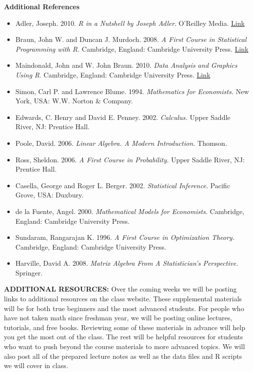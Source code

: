 \documentclass[12pt,a4paper]{article}
\begin{document}
\textbf{Additional References}
\begin{itemize}
\item Adler, Joseph. 2010. \textit{R in a Nutshell by Joseph Adler}. O'Reilley Media. \href{http://www.amazon.com/R-Nutshell-Joseph-Adler/dp/059680170X/ref=sr_1_1?ie=UTF8&qid=1305656181&sr=8-1-spell}{Link}

\item Braun, John W. and Duncan J. Murdoch. 2008. \textit{A First Course in Statistical Programming with R.} Cambridge, England: Cambridge University Press. \href{http://www.amazon.com/First-Course-Statistical-Programming/dp/0521694248/ref=sr_1_1?ie=UTF8&s=books&qid=1304605045&sr=8-1}{Link}
\item Maindonald, John and W. John Braun. 2010. \textit{Data Analysis and Graphics Using R}. Cambridge, England: Cambridge University Press. \href{http://www.amazon.com/Data-Analysis-Graphics-Using-Example-Based/dp/0521762936/ref=sr_1_1?ie=UTF8&s=books&qid=1305656286&sr=1-1}{Link}

\item Simon, Carl P. and Lawrence Blume. 1994. \textit{Mathematics for Economists.} New York, USA: W.W. Norton \& Company.
\item Edwards, C. Henry and David E. Penney. 2002. \textit{Calculus.} Upper Saddle River, NJ: Prentice Hall.
\item Poole, David. 2006. \textit{Linear Algebra. A Modern Introduction.} Thomson.
\item Ross, Sheldon. 2006. \textit{A First Course in Probability.} Upper Saddle River, NJ: Prentice Hall.
\item Casella, George and Roger L. Berger. 2002. \textit{Statistical Inference.} Pacific Grove, USA: Duxbury.
\item de la Fuente, Angel. 2000. \textit{Mathematical Models for Economists.} Cambridge, England: Cambridge University Press.
\item Sundaram, Rangarajan K. 1996. \textit{A First Course in Optimization Theory.} Cambridge, England: Cambridge University Press.
\item Harville, David A. 2008. \textit{Matrix Algebra From A Statistician's Perspective.} Springer.
\end{itemize}


\mbox{}
\textbf{ADDITIONAL RESOURCES:} Over the coming weeks we will be posting links to additional resources on the class website. These supplemental materials will be for both true beginners and the most advanced students. For people who have not taken math since freshman year, we will be posting online lectures, tutorials, and free books. Reviewing some of these materials in advance will help you get the most out of the class. The rest will be helpful resources for students who want to push beyond the course materials to more advanced topics. We will also post all of the prepared lecture notes as well as the data files and R scripts we will cover in class.\\
\end{document}
